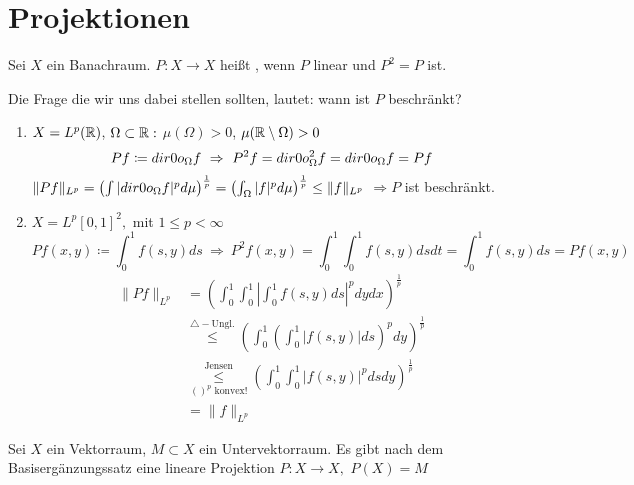 
\section{Projektionen}



\begin{definition} \label{def:11.1-Projektion}
	Sei $X$ ein Banachraum. $P \colon X \rightarrow X$ hei{\ss}t , wenn $P$ linear und $P^{2} = P$ ist.
\end{definition}

Die Frage die wir uns dabei stellen sollten, lautet: wann ist $P$ beschränkt?

\begin{beispiel}
	\begin{enumerate}[label=\alph*\upshape)]
		\item $X = L^{p}(\mathbb{R})$, $\Omega \subset \mathbb{R}: $ $\mu(\Omega) > 0$, $\mu(\mathbb{R} \setminus \Omega) > 0$
			\[ P f \coloneqq \1_{\Omega} f ~ \Rightarrow ~ P^{2} f = \1_{\Omega}^{2} f = \1_{\Omega} f = P f \]
			$\| P f \|_{L^{p}} = \left( \int | \1_{\Omega} f |^{p} d\mu \right)^{\frac{1}{p}} = \left( \int_{\Omega} | f |^{p} d\mu \right)^{\frac{1}{p}} \leq \| f \|_{L^{p}}$ $\Rightarrow P$ ist beschränkt.
		\item $X = L^{p}[0, 1]^{2},$ mit $1 \leq p < \infty$
			\[ P f(x, y) \coloneqq \int_{0}^{1} f(s, y) ds ~ \Rightarrow ~ P^{2} f (x, y) = \int_{0}^{1} \int_{0}^{1} f(s, y) ds dt = \int_{0}^{1} f(s, y) ds = P f(x, y) \]
			\begin{align*}
				\| P f \|_{L^{p}} & = \left( \int_{0}^{1} \int_{0}^{1} \left| \int_{0}^{1} f(s, y) ds \right|^{p} dy dx \right)^{\frac{1}{p}} \\
				& \overset{\triangle-\text{Ungl.}}{\leq} \left( \int_{0}^{1} \left( \int_{0}^{1} |f(s, y)| ds \right)^{p} dy \right)^{\frac{1}{p}} \\
				& \underset{()^{p} \text{ konvex!}}{\overset{\text{Jensen}}{\leq}}\left( \int_{0}^{1} \int_{0}^{1} |f(s, y)|^{p} ds dy \right)^{\frac{1}{p}} \\
				& = \| f \|_{L^{p}}
			\end{align*}
	\end{enumerate}
\end{beispiel}


\begin{bemerkung}
	Sei $X$ ein Vektorraum, $M \subset X$ ein Untervektorraum. Es gibt nach dem Basisergänzungssatz eine lineare Projektion $P \colon X \rightarrow X,$ $P(X) = M$	
\end{bemerkung}

